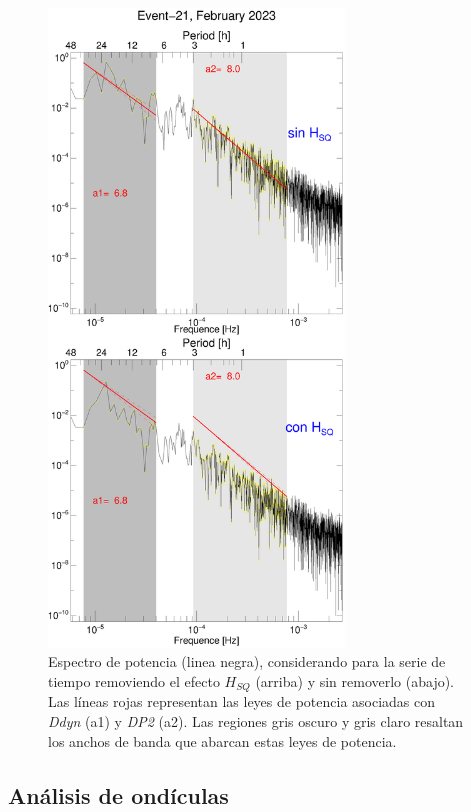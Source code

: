 \begin{figure}
    \centering
     \includegraphics[width=0.7\textwidth]{Images/cap3/powerlaw/diono_PWS_powerL_2023-02-25.eps}
      \caption{Espectro de potencia (linea negra), considerando para la serie de tiempo removiendo el efecto $H_{SQ}$ (arriba) y sin removerlo (abajo). Las líneas rojas representan las leyes de potencia asociadas con \emph{Ddyn} (a1) y \emph{DP2} (a2). Las regiones gris oscuro y gris claro resaltan los anchos de banda que abarcan estas leyes de potencia.}
       \label{fig:powerlaw}
\end{figure}


\subsection{Análisis de ondículas}

